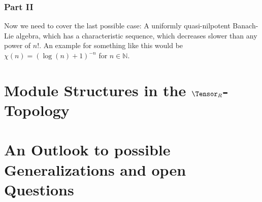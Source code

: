 \documentclass[
11pt,                          %
english                        %
]{article}
\begin{document}
\subsubsection{Part II}
Now we need to cover the last possible case: A uniformly quasi-nilpotent Banach-Lie 
algebra, which has a characteristic sequence, which decreases slower than any power 
of $n!$. An example for something like this would be $\chi(n) = (\log(n) + 1)^{-n}$ 
for $n \in \mathbb{N}$.

\section{Module Structures in the $\Tensor_R$-Topology}


\section{An Outlook to possible Generalizations and open Questions}
\end{document}
